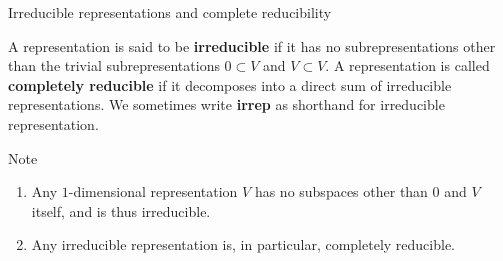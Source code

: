\begin{frame}{Irreducible representations and complete reducibility}
\begin{definition}
A representation is said to be \textbf{irreducible} if it has no subrepresentations other than the trivial subrepresentations $ 0 \subset V$ and $V \subset V$.  A representation is called \textbf{completely reducible} if it decomposes into a direct sum of irreducible representations.  We sometimes write \textbf{irrep} as shorthand for irreducible representation.
\end{definition}

\begin{block}{Note}
\begin{enumerate}
\item Any $1$-dimensional representation $V$ has no subspaces other than $0$ and $V$ itself, and is thus irreducible.
\item Any irreducible representation is, in particular, completely reducible.
\end{enumerate} \end{block}
\end{frame}

